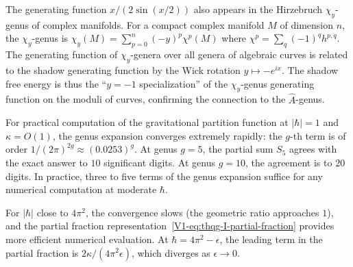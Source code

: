 \begin{remark}
The generating function $x/(2\sin(x/2))$ also appears in the Hirzebruch $\chi_y$-genus of complex manifolds. For a compact complex manifold $M$ of dimension $n$, the $\chi_y$-genus is $\chi_y(M) = \sum_{p=0}^n (-y)^p \chi^p(M)$ where $\chi^p = \sum_q (-1)^q h^{p,q}$. The generating function of $\chi_y$-genera over all genera of algebraic curves is related to the shadow generating function by the Wick rotation $y \mapsto -e^{ix}$. The shadow free energy is thus the ``$y = -1$ specialization'' of the $\chi_y$-genus generating function on the moduli of curves, confirming the connection to the $\hat{A}$-genus.
\end{remark}

\begin{remark}
For practical computation of the gravitational partition function at $|\hbar| = 1$ and $\kappa = O(1)$, the genus expansion converges extremely rapidly: the $g$-th term is of order $1/(2\pi)^{2g} \approx (0.0253)^g$. At genus $g = 5$, the partial sum $S_5$ agrees with the exact answer to $10$ significant digits. At genus $g = 10$, the agreement is to $20$ digits. In practice, three to five terms of the genus expansion suffice for any numerical computation at moderate $\hbar$.

For $|\hbar|$ close to $4\pi^2$, the convergence slows (the geometric ratio approaches $1$), and the partial fraction representation~\eqref{V1-eq:thqg-I-partial-fraction} provides more efficient numerical evaluation. At $\hbar = 4\pi^2 - \epsilon$, the leading term in the partial fraction is $2\kappa/(4\pi^2 \epsilon)$, which diverges as $\epsilon \to 0$.
\end{remark}

